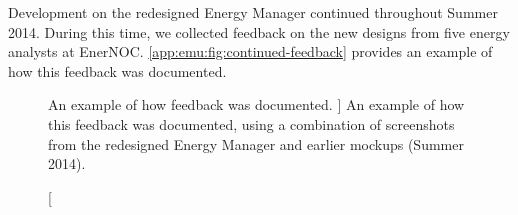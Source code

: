 
Development on the redesigned Energy Manager continued throughout Summer 2014.
During this time, we collected feedback on the new designs from five energy analysts at EnerNOC.
\autoref{app:emu:fig:continued-feedback} provides an example of how this feedback was documented.


\begin{figure}
	\centering
	\caption
	[
	    An example of how feedback was documented.
	]
	{
        An example of how this feedback was documented, using a combination of screenshots from the redesigned Energy Manager and earlier mockups (Summer 2014). 
	}
	\centering
	\label{app:emu:fig:continued-feedback}
\end{figure}

